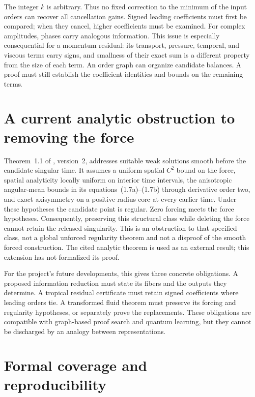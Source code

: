 The integer $k$ is arbitrary. Thus no fixed correction to the minimum of
the input orders can recover all cancellation gains. Signed leading
coefficients must first be compared; when they cancel, higher coefficients
must be examined. For complex amplitudes, phases carry analogous information.
This issue is especially consequential for a momentum residual: its
transport, pressure, temporal, and viscous terms carry signs, and smallness
of their exact sum is a different property from the size of each term.
An order graph can organize candidate balances. A proof must still establish
the coefficient identities and bounds on the remaining terms.

\section{A current analytic obstruction to removing the force}

Theorem~1.1 of \citet{ReductionCIV2026}, version~2, addresses suitable weak
solutions smooth before the candidate singular time. It assumes a uniform
spatial $C^2$ bound on the force, spatial analyticity locally uniform on
interior time intervals, the anisotropic angular-mean bounds in its
equations~(1.7a)--(1.7b) through derivative order two, and exact axisymmetry
on a positive-radius core at every earlier time. Under these hypotheses the
candidate point is regular. Zero forcing meets the force hypotheses.
Consequently, preserving this structural class while deleting the force
cannot retain the released singularity. This is an obstruction to that
specified class, not a global unforced regularity theorem and not a
disproof of the smooth forced construction. The cited analytic theorem is
used as an external result; this extension has not formalized its proof.

For the project's future developments, this gives three concrete obligations.
A proposed information reduction must state its fibers and the outputs they
determine. A tropical residual certificate must retain signed coefficients
where leading orders tie. A transformed fluid theorem must preserve its
forcing and regularity hypotheses, or separately prove the replacements.
These obligations are compatible with graph-based proof search and quantum
learning, but they cannot be discharged by an analogy between representations.

\section{Formal coverage and reproducibility}

